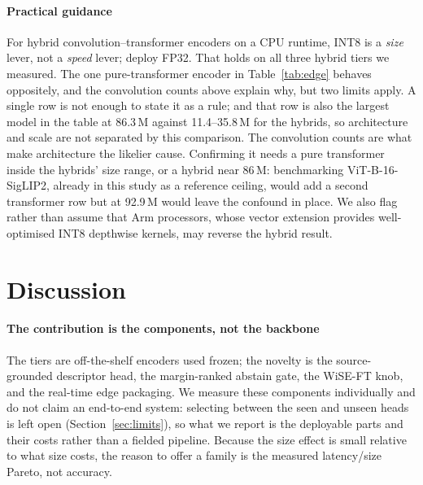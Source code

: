 \documentclass[a4paper,fleqn]{cas-dc}
\begin{document}
\paragraph{Practical guidance} For hybrid convolution--transformer encoders on a CPU runtime, INT8 is a
\emph{size} lever, not a \emph{speed} lever; deploy FP32. That holds on all three hybrid tiers we
measured. The one pure-transformer encoder in Table~\ref{tab:edge} behaves oppositely, and the convolution counts above explain why, but two limits apply. A single row is not enough to state it as a rule; and that row is also the largest model in the table at 86.3\,M against 11.4--35.8\,M for the hybrids, so architecture and scale are not separated by this comparison. The convolution counts are what make architecture the likelier cause. Confirming it needs a pure transformer inside the hybrids' size range, or a hybrid near 86\,M: benchmarking ViT-B-16-SigLIP2, already in this study as a reference ceiling, would add a second transformer row but at 92.9\,M would leave the confound in place. We also flag rather than assume that Arm processors,
whose vector extension provides well-optimised INT8 depthwise kernels, may reverse the hybrid
result.

\section{Discussion}

\paragraph{The contribution is the components, not the backbone} The tiers are off-the-shelf
encoders used frozen; the novelty is the source-grounded descriptor head, the margin-ranked abstain
gate, the WiSE-FT knob, and the real-time edge packaging. We measure these components
individually and do not claim an end-to-end system: selecting between the seen and unseen heads is
left open (Section~\ref{sec:limits}), so what we report is the deployable parts and their costs
rather than a fielded pipeline. Because the size effect is small relative to what size costs, the
reason to offer a family is the measured latency/size Pareto, not accuracy.
\end{document}
